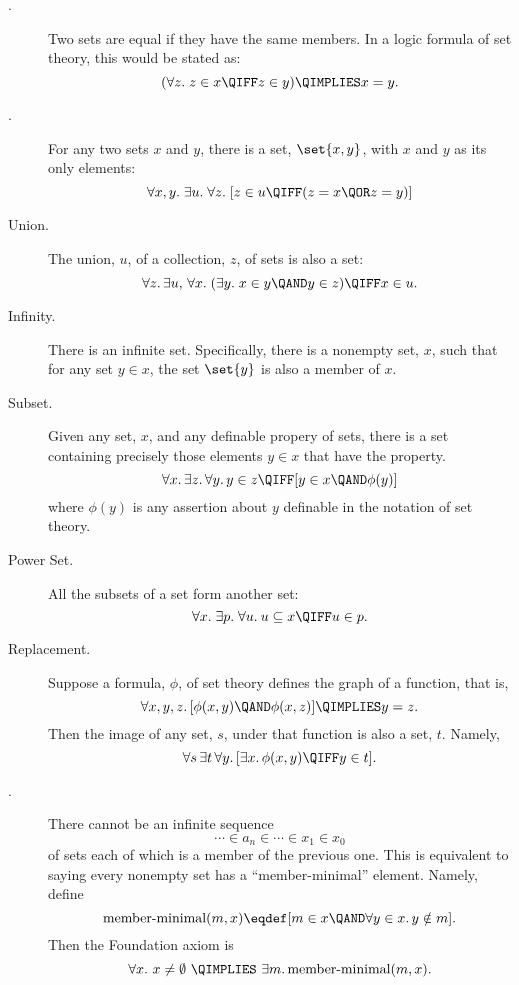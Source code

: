 \begin{description}

\item[.] Two sets are equal if they have the same
  members.  In a logic formula of set theory, this would be stated as:
\[
(\forall z.\; z \in x \QIFF z \in y) \QIMPLIES x = y.
\]

\item[.] For any two sets $x$ and $y$, there is a set,
     $\set{x,y}$, with $x$ and $y$ as its only elements:
\[
\forall x,y.\; \exists u.\; \forall z.\;
[z \in u \QIFF (z = x \QOR z = y)]
\]

\item[Union.] The union, $u$, of a collection, $z$, of sets is also a set:
\[
\forall z.\, \exists u,\, \forall x.\; (\exists y.\; x \in y \QAND y \in z) \QIFF x \in u.
\]

\item[Infinity.]  There is an infinite set.
  Specifically, there is a nonempty set, $x$, such that for any set $y \in
  x$, the set $\set{y}$ is also a member of $x$.


\item[Subset.] Given any set, $x$, and any definable propery of sets,
  there is a set containing precisely those elements $y \in x$ that
  have the property.
\[
\forall x.\, \exists z.\, \forall y.\, y \in z \QIFF [y \in x \QAND \phi(y)]
\]
where $\phi(y)$ is any assertion about $y$ definable in the notation
of set theory.

\item[Power Set.]  All the subsets of a set form another set:
\[
\forall x.\; \exists p.\; \forall u.\: u \subseteq x \QIFF u \in p.
\]

\item[Replacement.]  Suppose a formula, $\phi$,
  of set theory defines the graph of a function, that is,
\[
\forall x, y, z.\, [\phi(x,y) \QAND \phi(x,z)] \QIMPLIES y = z.
\]
Then the image of any set, $s$, under that function is also a set, $t$.  Namely,
\[
\forall s\, \exists t\, \forall y.\, [\exists x.\, \phi(x,y) \QIFF y \in t].
\]

\item[.] 
There cannot be an infinite sequence
\[
\cdots \in a_n \in \cdots \in x_1 \in x_0
\]
of sets each of which is a member of the previous one.  This is equivalent
to saying every nonempty set has a ``member-minimal'' element.  Namely, define
\[
\text{member-minimal}(m, x) \eqdef [m \in x \QAND \forall y \in x.\, y \notin m].
\]
Then the Foundation axiom is
\[
\forall x.\ x \neq \emptyset\ \QIMPLIES\ \exists m.\, \text{member-minimal}(m, x).
\]


\end{description}
